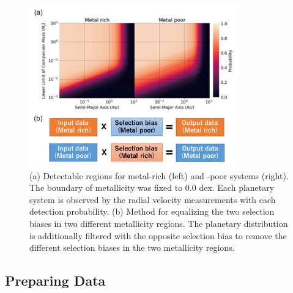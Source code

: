 \documentclass[twocolumn, dvipdfmx]{aastex62}
\begin{document}
\begin{CJK*}{UTF8}{min}
\begin{figure}[t]
\begin{center}
\includegraphics[width=9cm]{../../../Figure/selection_bias.pdf}
\caption{(a) Detectable regions for metal-rich (left) and -poor systems (right). The boundary of metallicity was fixed to 0.0 dex. Each planetary system is observed by the radial velocity measurements with each detection probability. (b) Method for equalizing the two selection biases in two different metallicity regions. The planetary distribution is additionally filtered with the opposite selection bias to remove the different selection biases in the two metallicity regions. \label{fig:bias}}
\end{center}
\end{figure}


\subsection{Preparing Data} \label{subsec:prepare}


\end{CJK*}
\end{document}
